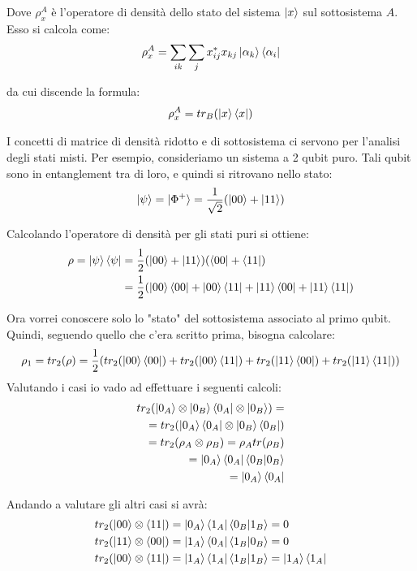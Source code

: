 \begin{info}
Dove \(\rho_x^A\) è l'operatore di densità dello stato del sistema \(\ket{x}\) sul sottosistema \(A\). Esso si calcola come:
\begin{gather*}
\rho_x^A=\sum_{ik}\sum_j x_{ij}^*x_{kj}\ket{\alpha_k}\bra{\alpha_i}
\end{gather*}

da cui discende la formula:
\begin{gather*}
\rho_x^A=tr_B(\ket{x}\bra{x})
\end{gather*}
\end{info}

I concetti di matrice di densità ridotto e di sottosistema ci servono per l'analisi degli stati misti. Per esempio, consideriamo un sistema a 2 qubit puro. Tali qubit sono in entanglement tra di loro, e quindi si ritrovano nello stato:
\begin{gather*}
\ket{\psi} = \ket{\Phi^+} = \frac{1}{\sqrt{2}}(\ket{00} + \ket{11})
\end{gather*}

Calcolando l'operatore di densità per gli stati puri si ottiene:
\begin{align*}
\rho=\ket{\psi}\bra{\psi} &= \frac{1}{2}(\ket{00} + \ket{11})(\bra{00} + \bra{11})\\
&=\frac{1}{2}(\ket{00}\bra{00} + \ket{00}\bra{11} + \ket{11}\bra{00} + \ket{11}\bra{11})
\end{align*}

Ora vorrei conoscere solo lo "stato" del sottosistema associato al primo qubit. Quindi, seguendo quello che c'era scritto prima, bisogna calcolare:
\begin{gather*}
\rho_1 = tr_2(\rho) =\frac{1}{2}(tr_2(\ket{00}\bra{00}) + tr_2(\ket{00}\bra{11}) + tr_2(\ket{11}\bra{00}) + tr_2(\ket{11}\bra{11}))
\end{gather*}
Valutando i casi io vado ad effettuare i seguenti calcoli:
\begin{align*}
tr_2(\ket{0_A}\otimes\ket{0_B} \bra{0_A}\otimes\ket{0_B})=&\\
=tr_2(\ket{0_A}\bra{0_A} \otimes \ket{0_B}\bra{0_B})&\\
=tr_2(\rho_A \otimes \rho_B) = \rho_A tr(\rho_B)&\\
=\ket{0_A}\bra{0_A}\braket{0_B | 0_B} &\\
= \ket{0_A}\bra{0_A}&
\end{align*}

Andando a valutare gli altri casi si avrà:
\begin{align*}
&tr_2(\ket{00}\otimes\bra{11}) = \ket{0_A}\bra{1_A}\braket{0_B|1_B} = 0\\
&tr_2(\ket{11}\otimes\bra{00}) = \ket{1_A}\bra{0_A}\braket{1_B|0_B}=0\\
&tr_2(\ket{00}\otimes\bra{11}) = \ket{1_A}\bra{1_A}\braket{1_B|1_B}=\ket{1_A}\bra{1_A}\\
\end{align*}

